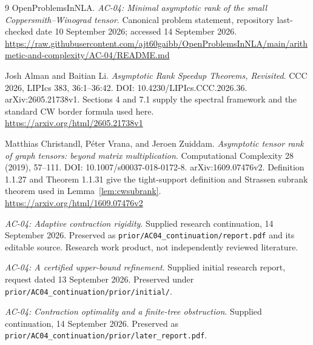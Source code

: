 \documentclass[11pt]{article}
\theoremstyle{definition}\newtheorem{definition}[theorem]{Definition}
\begin{document}
\begin{thebibliography}{9}
 OpenProblemsInNLA. \emph{AC-04: Minimal asymptotic rank of the small Coppersmith--Winograd tensor}. Canonical problem statement, repository last-checked date 10 September 2026; accessed 14 September 2026.\\
\url{https://raw.githubusercontent.com/ajt60gaibb/OpenProblemsInNLA/main/arithmetic-and-complexity/AC-04/README.md}

 Josh Alman and Baitian Li. \emph{Asymptotic Rank Speedup Theorems, Revisited}. CCC 2026, LIPIcs 383, 36:1--36:42. DOI: 10.4230/LIPIcs.CCC.2026.36. arXiv:2605.21738v1. Sections 4 and 7.1 supply the spectral framework and the standard CW border formula used here.\\
\url{https://arxiv.org/html/2605.21738v1}

 Matthias Christandl, P\'eter Vrana, and Jeroen Zuiddam. \emph{Asymptotic tensor rank of graph tensors: beyond matrix multiplication}. Computational Complexity 28 (2019), 57--111. DOI: 10.1007/s00037-018-0172-8. arXiv:1609.07476v2. Definition 1.1.27 and Theorem 1.1.31 give the tight-support definition and Strassen subrank theorem used in Lemma~\ref{lem:cwsubrank}.\\
\url{https://arxiv.org/html/1609.07476v2}

 \emph{AC-04: Adaptive contraction rigidity}. Supplied research continuation, 14 September 2026. Preserved as \texttt{prior/AC04\_continuation/report.pdf} and its editable source. Research work product, not independently reviewed literature.

 \emph{AC-04: A certified upper-bound refinement}. Supplied initial research report, request dated 13 September 2026. Preserved under \texttt{prior/AC04\_continuation/prior/initial/}.

 \emph{AC-04: Contraction optimality and a finite-tree obstruction}. Supplied continuation, 14 September 2026. Preserved as \texttt{prior/AC04\_continuation/prior/later\_report.pdf}.
\end{thebibliography}
\end{document}
